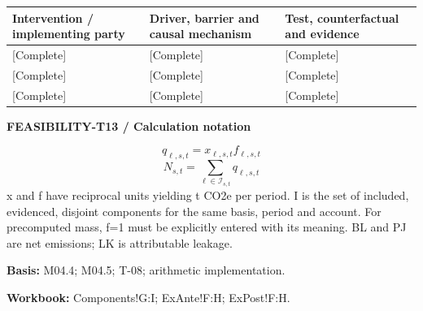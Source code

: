{\sffamily\fontsize{8.3}{10.3}\selectfont\begin{longtable}{@{}P{51.14mm} P{57.74mm} P{56.09mm}@{}}
\toprule
\textbf{Intervention / implementing party} & \textbf{Driver, barrier and causal mechanism} & \textbf{Test, counterfactual and evidence}\\\midrule\endhead
\rule{0pt}{7.7mm}[Complete] & [Complete] & [Complete]\\\hline
\rule{0pt}{7.7mm}[Complete] & [Complete] & [Complete]\\\hline
\rule{0pt}{7.7mm}[Complete] & [Complete] & [Complete]\\\hline
\end{longtable}}
\par\begingroup\sffamily\fontsize{8}{10}\selectfont\color{NEBGreen}\setlength{\parskip}{2pt}\setlength{\abovedisplayskip}{4pt}\setlength{\belowdisplayskip}{4pt}\setlength{\abovedisplayshortskip}{2pt}\setlength{\belowdisplayshortskip}{3pt}
\textbf{FEASIBILITY-T13 / Calculation notation}\par
{\fontsize{9}{11}\selectfont\[ q_{\ell,s,t}=x_{\ell,s,t}f_{\ell,s,t} \]}
{\fontsize{9}{11}\selectfont\[ N_{s,t}=\sum_{\ell\in\mathcal I_{s,t}}q_{\ell,s,t} \]}
x and f have reciprocal units yielding t CO2e per period. I is the set of included, evidenced, disjoint components for the same basis, period and account. For precomputed mass, f=1 must be explicitly entered with its meaning. BL and PJ are net emissions; LK is attributable leakage.\par
\textbf{Basis:} M04.4; M04.5; T-08; arithmetic implementation.\par
\textbf{Workbook:} Components!G:I; ExAnte!F:H; ExPost!F:H.\par\endgroup
